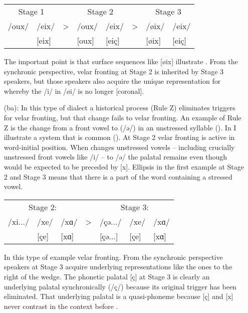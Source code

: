 \begin{itemize}
\ea \label{ex:16:7}\begin{tabular}[t]{@{}llcllcll@{}}
 \multicolumn{2}{c}{Stage 1} & & \multicolumn{2}{c}{Stage 2} & & \multicolumn{2}{c}{Stage 3}\\
  /oux/  &  /eix/ &  > &  /oux/ &  /eix/ & > &  /øix/ &  /eix/\\
 \relax [oux]  &  [eix] &    & [oux]  & [eiç]  &   & [øix]  & [eiç] \\
  \end{tabular}
\z 

The important point is that surface sequences like [øix] illustrate  . From the synchronic perspective, velar fronting at Stage 2 is inherited by Stage 3 speakers, but those speakers also acquire the unique representation for  whereby the /i/ in /øi/ is no longer [coronal].

\item[(ba):] In this type of dialect a historical process (Rule Z) eliminates triggers for velar fronting, but that change fails to  velar fronting. An example of Rule Z is the change from a front vowel to  (/ə/) in an unstressed syllable (). In  I illustrate a system that is common (). At Stage 2 velar fronting is active in word-initial position. When  changes unstressed vowels -- including crucially unstressed front vowels like /i/ -- to /ə/ the palatal remains even though  would be expected to be preceded by [x]. Ellipsis in the first example at Stage 2 and Stage 3 means that there is a part of the word containing a stressed vowel.

\ea%
    \label{ex:16:8}\begin{tabular}[t]{@{}lll c lll@{}}
    \multicolumn{3}{c}{Stage 2:}   & & \multicolumn{3}{c}{Stage 3:}\\
    /xi.../ & /xe/ & /xɑ/ & > & /çə.../  & /xe/ &   /xɑ/\\
\relax [çi...] & [çe] & [xɑ] &   &  [çə...] & [çe] & [xɑ]  \\
    \end{tabular}
\z 

\begin{sloppypar}
In this type of example   velar fronting. From the synchronic perspective speakers at Stage 3 acquire underlying representations like the ones to the right of the wedge. The phonetic palatal [ç] at Stage 3 is clearly an underlying palatal synchronically (/ç/) because its original trigger has been eliminated. That underlying palatal is a quasi-phoneme because [ç] and [x] never contrast in the context before .
\end{sloppypar}


\end{itemize}
